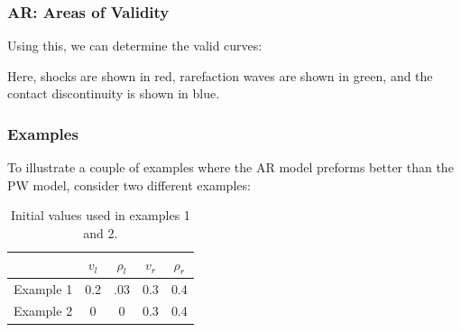\documentclass{beamer}
\begin{document}
\begin{frame}
\frametitle{AR: Areas of Validity}
Using this, we can determine the valid curves:
\begin{figure}[h!]
\end{figure}
Here, shocks are shown in red, rarefaction waves are shown in green, and the contact discontinuity is shown in blue.
\end{frame}



\begin{frame}
\frametitle{Examples}

To illustrate a couple of examples where the AR model preforms better than the PW model, consider two different examples: 
\begin{table}[t]
\caption{Initial values used in examples 1 and 2.}
\begin{center}
\begin{tabular}{| c | c c  c c|}
\hline
& $v_l$ & $\rho_l $ & $v_r$ & $\rho_r $\\
\hline
Example 1 & 0.2 & .03 & 0.3 & 0.4 \\
Example 2 & 0 & 0 & 0.3 & 0.4\\
\hline
\end{tabular}
\end{center}
\end{table}
\end{frame}
\end{document}
